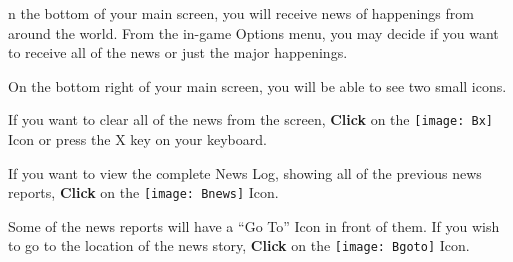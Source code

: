 

n the bottom of your main screen, you will receive news of happenings from around the world. From the in-game Options menu, you may decide if you want to receive all of the news or just the major happenings.

On the bottom right of your main screen, you will be able to see two small icons.


If you want to clear all of the news from the screen, \textbf{Click} on the \texttt{[image: Bx]} Icon or press the X key on your keyboard.

If you want to view the complete News Log, showing all of the previous news reports, \textbf{Click} on the \texttt{[image: Bnews]} Icon.


Some of the news reports will have a “Go To” Icon in front of them. If you wish to go to the location of the news story, \textbf{Click} on the \texttt{[image: Bgoto]} Icon.
